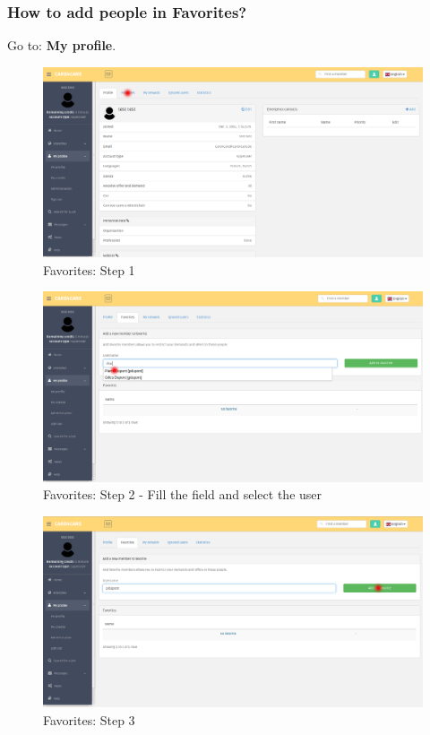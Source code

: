 \documentclass{article}
\begin{document}
\subsubsection{How to add people in Favorites?}
Go to: \textbf{My profile}.
\begin{figure}[!ht]
   \includegraphics[width=\textwidth]{img/fav1.png}
   \caption{Favorites: Step 1}
\end{figure}
\begin{figure}[!ht]
   \includegraphics[width=\textwidth]{img/fav2.png}
   \caption{Favorites: Step 2 - Fill the field and select the user}
\end{figure}
\begin{figure}[!ht]
   \includegraphics[width=\textwidth]{img/fav3.png}
   \caption{Favorites: Step 3}
\end{figure}
\end{document}
